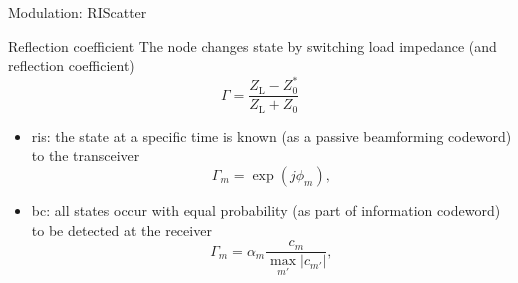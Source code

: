 \documentclass[presentation,xcolor={table},9pt]{beamer}
\begin{document}
\begin{section}{Modulation: RIScatter}
	\begin{frame}{Reflection coefficient}
		The node changes state by switching load impedance (and reflection coefficient)
		\begin{equation*}
			\Gamma = \frac{Z_\mathrm{L} - Z_0^*}{Z_\mathrm{L} + Z_0}
		\end{equation*}
		\vspace{-0.25cm}
		\begin{figure}
			\centering
			\resizebox{0.6\columnwidth}{!}{
				
			}
		\end{figure}
		\vspace{-0.25cm}
		\begin{itemize}
			\item \gls{ris}: the state at a specific time is known (as a passive beamforming codeword) to the transceiver
			\begin{equation*}
				\Gamma_m = \exp(j \phi_m),
			\end{equation*}
			\item \gls{bc}: all states occur with equal probability (as part of information codeword) to be detected at the receiver
			\begin{equation*}
				\Gamma_m = \alpha_m \frac{c_m}{\max_{m'} \lvert c_{m'} \rvert},
			\end{equation*}
		\end{itemize}
	\end{frame}


\end{section}
\end{document}
